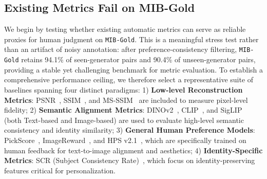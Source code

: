 \documentclass{article}
\begin{document}





\subsection{Existing Metrics Fail on MIB-Gold}

We begin by testing whether existing automatic metrics can serve as reliable proxies for human judgment on \texttt{MIB-Gold}. This is a meaningful stress test rather than an artifact of noisy annotation: after preference-consistency filtering, \texttt{MIB-Gold} retains 94.1\% of seen-generator pairs and 90.4\% of unseen-generator pairs, providing a stable yet challenging benchmark for metric evaluation. To establish a comprehensive performance ceiling, we therefore select a representative suite of baselines spanning four distinct paradigms: 1) \textbf{Low-level Reconstruction Metrics}: PSNR~\cite{hore2010image}, SSIM~\cite{wang2004image}, and MS-SSIM~\cite{wang2003multiscale} are included to measure pixel-level fidelity; 2) \textbf{Semantic Alignment Metrics}: DINOv2~\cite{oquab2023dinov2}, CLIP~\cite{radford2021learning}, and SigLIP~\cite{zhai2023sigmoid} (both Text-based and Image-based) are used to evaluate high-level semantic consistency and identity similarity; 3) \textbf{General Human Preference Models}: PickScore~\cite{kirstain2023pick}, ImageReward~\cite{xu2023imagereward}, and HPS v2.1~\cite{wu2023human}, which are specifically trained on human feedback for text-to-image alignment and aesthetics; 4) \textbf{Identity-Specific Metrics}: SCR (Subject Consistency Rate)~\cite{chen2026identities}, which focus on  identity-preserving features critical for personalization.
\end{document}
